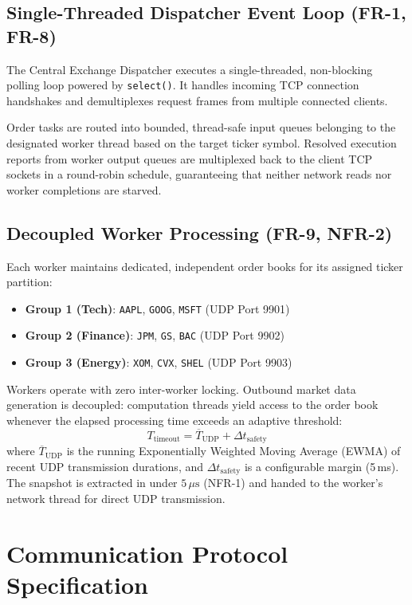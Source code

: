 \documentclass[11pt,a4paper]{article}
\begin{document}
\subsection{Single-Threaded Dispatcher Event Loop (FR-1, FR-8)}
The Central Exchange Dispatcher executes a single-threaded, non-blocking polling loop powered by \texttt{select()}. It handles incoming TCP connection handshakes and demultiplexes request frames from multiple connected clients. 

Order tasks are routed into bounded, thread-safe input queues belonging to the designated worker thread based on the target ticker symbol. Resolved execution reports from worker output queues are multiplexed back to the client TCP sockets in a round-robin schedule, guaranteeing that neither network reads nor worker completions are starved.

\subsection{Decoupled Worker Processing (FR-9, NFR-2)}
Each worker maintains dedicated, independent order books for its assigned ticker partition:
\begin{itemize}
    \item \textbf{Group 1 (Tech)}: \texttt{AAPL}, \texttt{GOOG}, \texttt{MSFT} (UDP Port 9901)
    \item \textbf{Group 2 (Finance)}: \texttt{JPM}, \texttt{GS}, \texttt{BAC} (UDP Port 9902)
    \item \textbf{Group 3 (Energy)}: \texttt{XOM}, \texttt{CVX}, \texttt{SHEL} (UDP Port 9903)
\end{itemize}
Workers operate with zero inter-worker locking. Outbound market data generation is decoupled: computation threads yield access to the order book whenever the elapsed processing time exceeds an adaptive threshold:
\begin{equation}
T_{\text{timeout}} = \overline{T}_{\text{UDP}} + \Delta t_{\text{safety}}
\end{equation}
where $\overline{T}_{\text{UDP}}$ is the running Exponentially Weighted Moving Average (EWMA) of recent UDP transmission durations, and $\Delta t_{\text{safety}}$ is a configurable margin (5\,ms). The snapshot is extracted in under $5\,\mu\text{s}$ (NFR-1) and handed to the worker's network thread for direct UDP transmission.

\section{Communication Protocol Specification}
\end{document}
